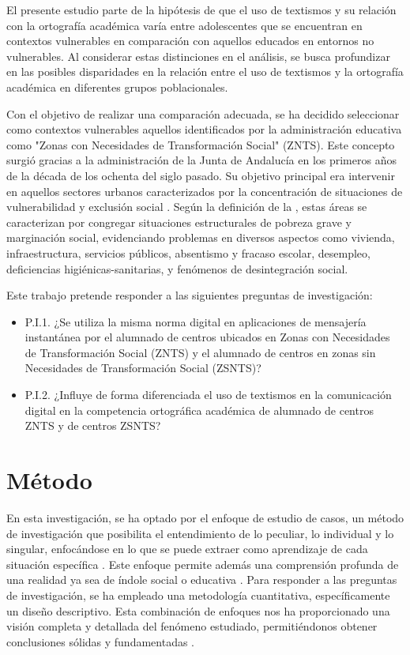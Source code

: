 \documentclass[spanish]{textolivre}
\begin{document}
El presente estudio parte de la hipótesis de que el uso de textismos y su relación con la ortografía académica varía entre adolescentes que se encuentran en contextos vulnerables en comparación con aquellos educados en entornos no vulnerables. Al considerar estas distinciones en el análisis, se busca profundizar en las posibles disparidades en la relación entre el uso de textismos y la ortografía académica en diferentes grupos poblacionales.

Con el objetivo de realizar una comparación adecuada, se ha decidido seleccionar como contextos vulnerables aquellos identificados por la administración educativa como "Zonas con Necesidades de Transformación Social" (ZNTS). Este concepto surgió gracias a la administración de la Junta de Andalucía en los primeros años de la década de los ochenta del siglo pasado. Su objetivo principal era intervenir en aquellos sectores urbanos caracterizados por la concentración de situaciones de vulnerabilidad y exclusión social \cite[p. 27]{munoz-garcia2023}. Según la definición de la \textcite{junta_de_andalucia_zonas_nodate}, estas áreas se caracterizan por congregar situaciones estructurales de pobreza grave y marginación social, evidenciando problemas en diversos aspectos como vivienda, infraestructura, servicios públicos, absentismo y fracaso escolar, desempleo, deficiencias higiénicas-sanitarias, y fenómenos de desintegración social. 

Este trabajo pretende responder a las siguientes preguntas de investigación:

\begin{itemize}
    \item P.I.1. ¿Se utiliza la misma norma digital en aplicaciones de mensajería instantánea por el alumnado de centros ubicados en Zonas con Necesidades de Transformación Social (ZNTS) y el alumnado de centros en zonas sin Necesidades de Transformación Social (ZSNTS)? 
    \item P.I.2. ¿Influye de forma diferenciada el uso de textismos en la comunicación digital en la competencia ortográfica académica de alumnado de centros ZNTS y de centros ZSNTS? 
\end{itemize}


\section{Método}

En esta investigación, se ha optado por el enfoque de estudio de casos, un método de investigación que posibilita el entendimiento de lo peculiar, lo individual y lo singular, enfocándose en lo que se puede extraer como aprendizaje de cada situación específica \cite{Stake1995}. Este enfoque permite además una comprensión profunda de una realidad ya sea de índole social o educativa \cite[p. 302]{Bisquerra}. Para responder a las preguntas de investigación, se ha empleado una metodología cuantitativa, específicamente un diseño descriptivo. Esta combinación de enfoques nos ha proporcionado una visión completa y detallada del fenómeno estudiado, permitiéndonos obtener conclusiones sólidas y fundamentadas \cite{gomez-camacho_ke_2023a}.
\end{document}
